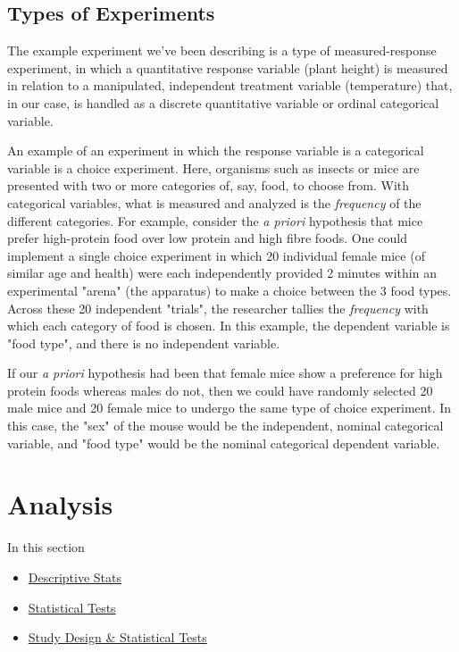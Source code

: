 \documentclass[
]{book}
\providecommand{\tightlist}{%
  \setlength{\itemsep}{0pt}\setlength{\parskip}{0pt}}
\begin{document}
\hypertarget{types-of-experiments}{%
\subsection*{Types of Experiments}\label{types-of-experiments}}

The example experiment we've been describing is a type of measured-response experiment, in which a quantitative response variable (plant height) is measured in relation to a manipulated, independent treatment variable (temperature) that, in our case, is handled as a discrete quantitative variable or ordinal categorical variable.

An example of an experiment in which the response variable is a categorical variable is a choice experiment. Here, organisms such as insects or mice are presented with two or more categories of, say, food, to choose from. With categorical variables, what is measured and analyzed is the \emph{frequency} of the different categories. For example, consider the \emph{a priori} hypothesis that mice prefer high-protein food over low protein and high fibre foods. One could implement a single choice experiment in which 20 individual female mice (of similar age and health) were each independently provided 2 minutes within an experimental "arena" (the apparatus) to make a choice between the 3 food types. Across these 20 independent "trials", the researcher tallies the \emph{frequency} with which each category of food is chosen. In this example, the dependent variable is "food type", and there is no independent variable.

If our \emph{a priori} hypothesis had been that female mice show a preference for high protein foods whereas males do not, then we could have randomly selected 20 male mice and 20 female mice to undergo the same type of choice experiment. In this case, the "sex" of the mouse would be the independent, nominal categorical variable, and "food type" would be the nominal categorical dependent variable.

\hypertarget{analysis}{%
\section{Analysis}\label{analysis}}

In this section

\begin{itemize}
\tightlist
\item
  \protect\hyperlink{descriptive-stats}{Descriptive Stats}
\item
  \protect\hyperlink{statistical-tests}{Statistical Tests}
\item
  \protect\hyperlink{study-design-statistical-tests}{Study Design \& Statistical Tests}
\end{itemize}
\end{document}

